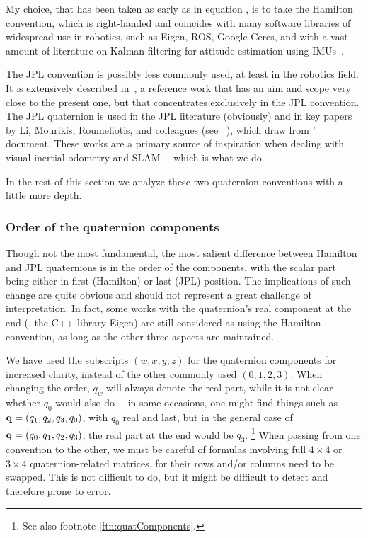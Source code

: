My choice, that has been taken as early as in equation , is to take the Hamilton convention, 
which is right-handed and coincides with many software libraries of widespread use in robotics, such as Eigen, ROS, Google Ceres, 
and with a vast amount of literature on Kalman filtering for attitude estimation using IMUs~\citep[and many others]{CHOU-92,KUIPERS-99,PINIES-07,ROUSSILLON-11a,MARTINELLI-12}.

The JPL convention is possibly less commonly used, at least in the robotics field. 
It is extensively described in~\citep{TRAWNY-05-QUAT}, a reference work that has an aim and scope very close to the present one, but that concentrates exclusively in the JPL convention. 
The JPL quaternion is used in the JPL literature (obviously) and in key papers by Li, Mourikis, Roumeliotis, and colleagues (see \eg~\citep{LI-2012,LI-14}), which draw from \citeauthor{TRAWNY-05-QUAT}' document. 
These works are a primary source of inspiration when dealing with visual-inertial odometry and SLAM ---which is what we do. 

In the rest of this section we analyze these two quaternion conventions with a little more depth.


\subsubsection{Order of the quaternion components}

Though not the most fundamental, the most salient difference between Hamilton and JPL quaternions is in the order of the components, with the scalar part being either in first (Hamilton) or last (JPL) position. 
The implications of such change are quite obvious and should not represent a great challenge of interpretation. 
In fact, some works with the quaternion's real component at the end (\eg, the C++ library Eigen) are still considered as using the Hamilton convention, as long as the other three aspects are maintained.

We have used the subscripts $(w, x, y, z)$ for the quaternion components for increased clarity, instead of the other commonly used $(0, 1, 2, 3)$. 
When changing the order, $q_w$ will always denote the real part, while it is not clear whether $q_0$ would also do 
---in some occasions, one might find things such as ${\bf q}=(q_1, q_2, q_3, q_0)$, with $q_0$ real and last, but in the general case of ${\bf q}=(q_0, q_1, q_2, q_3)$, the real part at the end would be $q_3$.%
\footnote{See also footnote \ref{ftn:quatComponents}.} 
When passing from one convention to the other, we must be careful of formulas involving full $4\times4$ or $3\times4$ quaternion-related matrices, 
for their rows and/or columns need to be swapped. 
This is not difficult to do, but it might be difficult to detect and therefore prone to error.

